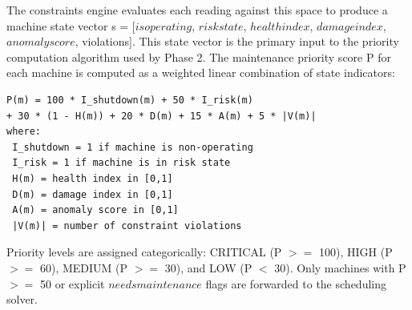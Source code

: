 The constraints engine evaluates each reading against this space to produce a machine state vector s = [$is operating$, $risk state$, $health index$, $damage index$, $anomaly score$, violations]. This state vector is the primary input to the priority computation algorithm used by Phase 2. The maintenance priority score P for each machine is computed as a weighted linear combination of state indicators:

\begin{verbatim}
P(m) = 100 * I_shutdown(m) + 50 * I_risk(m) 
+ 30 * (1 - H(m)) + 20 * D(m) + 15 * A(m) + 5 * |V(m)|
where:
 I_shutdown = 1 if machine is non-operating
 I_risk = 1 if machine is in risk state
 H(m) = health index in [0,1]
 D(m) = damage index in [0,1]
 A(m) = anomaly score in [0,1]
 |V(m)| = number of constraint violations
\end{verbatim}

Priority levels are assigned categorically: CRITICAL (P $>=$ 100), HIGH (P $>=$ 60), MEDIUM (P $>=$ 30), and LOW (P $<$ 30). Only machines with P $>=$ 50 or explicit $needs maintenance$ flags are forwarded to the scheduling solver.

